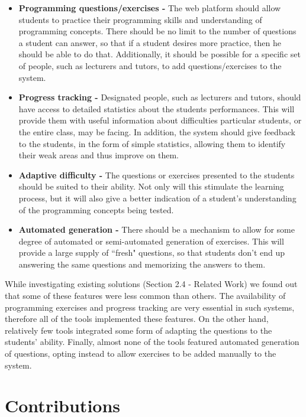 \documentclass[11pt,a4paper]{report}
\begin{document}
\begin{itemize}
\item \textbf{Programming questions/exercises -} The web platform should allow students to practice their programming skills and understanding of programming concepts. There should be no limit to the number of questions a student can answer, so that if a student desires more practice, then he should be able to do that. Additionally, it should be possible for a specific set of people, such as lecturers and tutors, to add questions/exercises to the system.
\item \textbf{Progress tracking -} Designated people, such as lecturers and tutors, should have access to detailed statistics about the students performances. This will provide them with useful information about difficulties particular students, or the entire class, may be facing. In addition, the system should give feedback to the students, in the form of simple statistics, allowing them to identify their weak areas and thus improve on them.
\item \textbf{Adaptive difficulty -} The questions or exercises presented to the students should be suited to their ability. Not only will this stimulate the learning process, but it will also give a better indication of a student's understanding of the programming concepts being tested.
\item \textbf{Automated generation -} There should be a mechanism to allow for some degree of automated or semi-automated generation of exercises. This will provide a large supply of ``fresh" questions, so that students don't end up answering the same questions and memorizing the answers to them.
\end{itemize}

While investigating existing solutions (Section 2.4 - Related Work) we found out that some of these features were less common than others. The availability of programming exercises and progress tracking are very essential in such systems, therefore all of the tools implemented these features. On the other hand, relatively few tools integrated some form of adapting the questions to the students' ability. Finally, almost none of the tools featured automated generation of questions, opting instead to allow exercises to be added manually to the system.

\section{Contributions}
\end{document}
